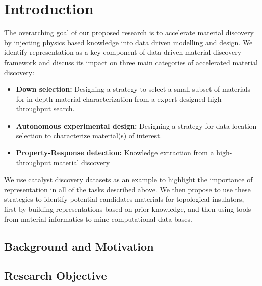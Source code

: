 \chapter{Introduction}\label{chap:intro}
The overarching goal of our proposed research is to accelerate material discovery by injecting physics based knowledge into data driven modelling and design. We identify representation as a key component of data-driven material discovery framework and discuss its impact on three main categories of accelerated material discovery:
\begin{itemize}
    \item {\textbf{Down selection: }Designing a strategy to select a small subset of materials for in-depth material characterization from a expert designed high-throughput search.}
    \item {\textbf{Autonomous experimental design: }Designing a strategy for data location selection to characterize material(s) of interest.}
    \item {\textbf{Property-Response detection: }Knowledge extraction from a high-throughput material discovery }
\end{itemize}
We use catalyst discovery datasets as an example to highlight the importance of representation in all of the tasks described above. We then propose to use these strategies to identify potential candidates materials for topological insulators, first by building representations based on prior knowledge, and then using tools from material informatics to mine computational data bases. 
\section{Background and Motivation}\label{sec1.1}
 
\section{Research Objective}\label{sec1.2}

